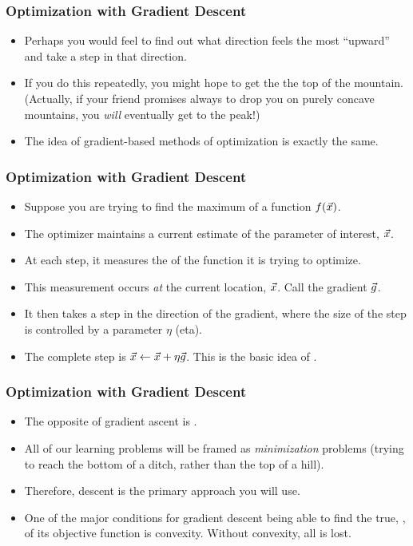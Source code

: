\documentclass[trans,aspectratio=169]{beamer}
\begin{document}
\begin{frame}
  \frametitle{Optimization with Gradient Descent}
\begin{itemize}
\item
Perhaps you would feel to find out what direction
feels the most ``upward'' and take a step in that direction. 
\item If you
do this repeatedly, you might hope to get the the top of the mountain.
(Actually, if your friend promises always to drop you on purely
concave mountains, you \emph{will} eventually get to the peak!)
\item
The idea of gradient-based methods of optimization is exactly the
same.
\end{itemize}
\end{frame}

\begin{frame}
  \frametitle{Optimization with Gradient Descent}
\begin{itemize}
\item
  Suppose you are trying to find the maximum of a function
$f({\vec x})$.
\item  The optimizer maintains a current estimate of the parameter
of interest, ${\vec x}$. 
\item At each step, it measures the 
of the function it is trying to optimize. 
\item This measurement occurs
\emph{at} the current location, ${\vec x}$.  Call the gradient ${\vec g}$.
\item  It
then takes a step in the direction of the gradient, where the size of
the step is controlled by a parameter $\eta$ (eta).  
\item The complete step
is ${\vec x} \leftarrow {\vec x} + \eta {\vec g}$.  This is the basic idea of
.
\end{itemize}
\end{frame}

\begin{frame}
  \frametitle{Optimization with Gradient Descent}
\begin{itemize}
\item
The opposite of gradient ascent is .  
\item All of
our learning problems will be framed as \emph{minimization} problems
(trying to reach the bottom of a ditch, rather than the top of a
hill).  
\item Therefore, descent is the primary approach you will use.
\item One of the major conditions for gradient descent being able to find the
true, , of its objective function is
convexity.  Without convexity, all is lost.
\end{itemize}
\end{frame}
\end{document}
